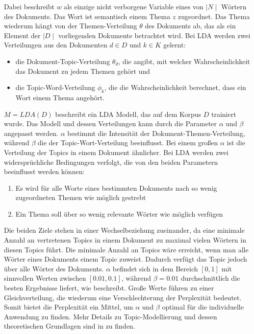 \documentclass[german,version-2020-11]{uzl-thesis}
\begin{document}
Dabei beschreibt $w$ als einzige nicht verborgene Variable eines von $\mid N \mid$ Wörtern des Dokuments. Das Wort ist semantisch einem Thema $z$ zugeordnet. Das Thema wiederum hängt von der Themen-Verteilung $\theta$ des Dokuments ab, das als ein Element der $\mid D \mid$ vorliegenden Dokumente betrachtet wird. Bei LDA werden zwei Verteilungen aus den Dokumenten $d \in D$ und $k \in K$ gelernt: 

\begin{itemize}
\item die Dokument-Topic-Verteilung $\theta_d$, die angibt, mit welcher Wahrscheinlichkeit das Dokument zu jedem Themen gehört und 
\item die Topic-Word-Verteilung $\phi_k$, die die Wahrscheinlichkeit berechnet, dass ein Wort einem Thema angehört. 
\end{itemize}

$M = LDA(D)$ beschreibt ein LDA Modell, das auf dem Korpus $D$ trainiert wurde. Das Modell und dessen Verteilungen kann durch die Parameter $\alpha$ und $\beta$ angepasst werden. $\alpha$ bestimmt die Intensität der Dokument-Themen-Verteilung, während $\beta$ die der Topic-Wort-Verteilung beeinflusst. Bei einem großen $\alpha$ ist die Verteilung der Topics in einem Dokument ähnlicher. Bei LDA werden zwei widersprüchliche Bedingungen verfolgt, die von den beiden Parametern beeinflusst werden können:
\begin{enumerate}
\item Es wird für alle Worte eines bestimmten Dokuments nach so wenig zugeordneten Themen wie möglich gestrebt
\item Ein Thema soll über so wenig relevante Wörter wie möglich verfügen
\end{enumerate}

Die beiden Ziele stehen in einer Wechselbeziehung zueinander, da eine minimale Anzahl an vertretenen Topics in einem Dokument zu maximal vielen Wörtern in diesen Topics führt. Die minimale Anzahl an Topics wäre erreicht, wenn man alle Wörter eines Dokuments einem Topic zuweist. Dadurch verfügt das Topic jedoch über alle Wörter des Dokuments. $\alpha$ befindet sich in dem Bereich $[0,1]$ mit sinnvollen Werten zwischen $[0.01, 0.1]$, während $\beta =0.01$ durchschnittlich die besten Ergebnisse liefert, wie \cite{magnus} beschreibt. Große Werte führen zu einer Gleichverteilung, die wiederum eine Verschlechterung der Perplexität bedeutet. Somit bietet die Perplexität ein Mittel, um $\alpha$ und $\beta$ optimal für die individuelle Anwendung zu finden. Mehr Details zu Topic-Modellierung und dessen theoretischen Grundlagen sind in \cite{towardsdat} zu finden.\\
\end{document}
